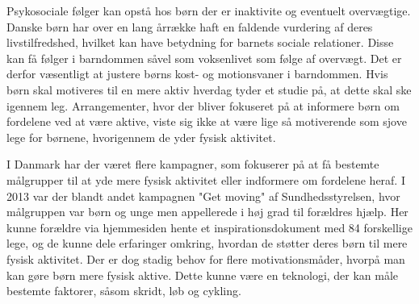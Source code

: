 
Psykosociale følger kan opstå hos børn der er inaktivite og eventuelt overvægtige. Danske børn har over en lang årrække haft en faldende vurdering af deres livstilfredshed, hvilket kan have betydning for barnets sociale relationer. Disse kan få følger i barndommen såvel som voksenlivet som følge af overvægt. Det er derfor væsentligt at justere børns kost- og motionsvaner i barndommen. \citep{Universitet2014,StatensInstitutforFolkesundhed2007} Hvis børn skal motiveres til en mere aktiv hverdag tyder et studie på, at dette skal ske igennem leg. Arrangementer, hvor der bliver fokuseret på at informere børn om fordelene ved at være aktive, viste sig ikke at være lige så motiverende som sjove lege for børnene, hvorigennem de yder fysisk aktivitet. %
\citep{J.Sebire2013}

I Danmark har der været flere kampagner, som fokuserer på at få bestemte målgrupper til at yde mere fysisk aktivitet eller indformere om fordelene heraf. I 2013 var der blandt andet kampagnen "Get moving" af Sundhedsstyrelsen, hvor målgruppen var børn og unge men appellerede i høj grad til forældres hjælp. Her kunne forældre via hjemmesiden hente et inspirationsdokument med 84 forskellige lege, og de kunne dele erfaringer omkring, hvordan de støtter deres børn til mere fysisk aktivitet.  \citep{Sundhedsstyrelsen2013} Der er dog stadig behov for flere motivationsmåder, hvorpå man kan gøre børn mere fysisk aktive. Dette kunne være en teknologi, der kan måle bestemte faktorer, såsom skridt, løb og cykling.  

